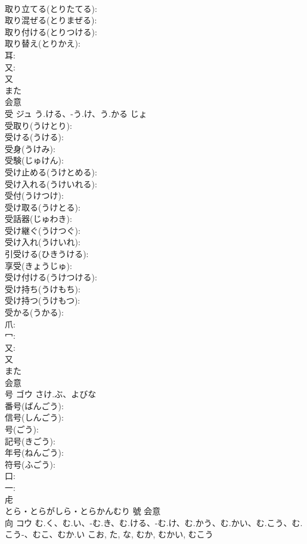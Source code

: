 \documentclass[8pt]{extreport}
\begin{document}
\begin{CJK}{UTF8}{min}
\\	取り立てる(とりたてる): 
\\	取り混ぜる(とりまぜる): 
\\	取り付ける(とりつける): 
\\	取り替え(とりかえ): 
\\	耳: 
\\	又: 
\\	又	
\\	また	
\\	会意 
\\	受	ジュ	う.ける、-う.け、う.かる	じょ	
\\	受取り(うけとり): 
\\	受ける(うける): 
\\	受身(うけみ): 
\\	受験(じゅけん): 
\\	受け止める(うけとめる): 
\\	受け入れる(うけいれる): 
\\	受付(うけつけ): 
\\	受け取る(うけとる): 
\\	受話器(じゅわき): 
\\	受け継ぐ(うけつぐ): 
\\	受け入れ(うけいれ): 
\\	引受ける(ひきうける): 
\\	享受(きょうじゅ): 
\\	受け付ける(うけつける): 
\\	受け持ち(うけもち): 
\\	受け持つ(うけもつ): 
\\	受かる(うかる): 
\\	爪: 
\\	冖: 
\\	又: 
\\	又	
\\	また	
\\	会意 
\\	号	ゴウ	さけ.ぶ、よびな		
\\	番号(ばんごう): 
\\	信号(しんごう): 
\\	号(ごう): 
\\	記号(きごう): 
\\	年号(ねんごう): 
\\	符号(ふごう): 
\\	口: 
\\	一: 
\\	虍	
\\	とら・とらがしら・とらかんむり	號	会意 
\\	向	コウ	む.く、む.い、-む.き、む.ける、-む.け、む.かう、む.かい、む.こう、む.こう-、むこ、むか.い	こお, た, な, むか, むかい, むこう	

\end{CJK}
\end{document}
